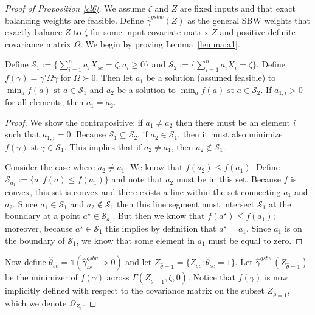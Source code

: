 \begin{proof}[Proof of Proposition \ref{cl6}]
We assume $\zeta$ and $Z$ are fixed inputs and that exact balancing weights are feasible. Define $\hat{\gamma}^{gsbw}(Z)$ as the general SBW weights that exactly balance $Z$ to $\zeta$ for some input covariate matrix $Z$ and positive definite covariance matrix $\Omega$. We begin by proving Lemma~\ref{lemma:a1}.

\begin{lemma}\label{lemma:a1}
    Define $\mathcal{S}_1 := \{\sum_{i=1}^n a_{i}X_{sc} = \zeta, a_{i} \ge 0\}$ and $\mathcal{S}_2 := \{\sum_{i=1}^n a_{i}X_{i} = \zeta\}$. Define $f(\gamma) = \gamma'\Omega\gamma$ for $\Omega \succ 0$. Then let $a_1$ be a solution (assumed feasible) to $\min_a f(a) \text{ st } a \in \mathcal{S}_1$ and $a_2$ be a solution to $\min_a f(a) \text{ st } a \in \mathcal{S}_2$. If $a_{1, i} > 0$ for all elements, then $a_1 = a_2$.
\end{lemma}

\begin{proof}
    We show the contrapositive: if $a_1 \ne a_2$ then there must be an element $i$ such that $a_{1, i} = 0$. Because $\mathcal{S}_1 \subseteq \mathcal{S}_2$, if $a_2 \in \mathcal{S}_1$, then it must also minimize $f(\gamma) \text{ st } \gamma \in \mathcal{S}_1$. This implies that if $a_2 \ne a_1$, then $a_2 \not\in \mathcal{S}_1$.
    
    Consider the case where $a_2 \ne a_1$. We know that $f(a_2) \le f(a_1)$. Define $\mathcal{S}_{a_1} := \{a: f(a) \le f(a_1)\}$ and note that $a_2$ must be in this set. Because $f$ is convex, this set is convex and there exists a line within the set connecting $a_1$ and $a_2$. Since $a_1 \in \mathcal{S}_1$ and $a_2 \not\in\mathcal{S}_1$ then this line segment must intersect $\mathcal{S}_1$ at the boundary at a point $a^\star \in \mathcal{S}_{a_1}$. But then we know that $f(a^\star) \le f(a_1)$; moreover, because $a^\star \in \mathcal{S}_1$ this implies by definition that $a^\star = a_1$. Since $a_1$ is on the boundary of $\mathcal{S}_1$, we know that some element in $a_1$ must be equal to zero. 
\end{proof}

Now define $\hat{\theta}_{sc} = \mathds{1}(\hat{\gamma}_{sc}^{gsbw} > 0)$ and let $Z_{\hat{\theta} = 1} = \{Z_{sc}: \hat{\theta}_{sc} = 1\}$. Let $\hat{\gamma}^{gsbw}(Z_{\hat{\theta} = 1})$ be the minimizer of $f(\gamma)$ across $\Gamma(Z_{\hat{\theta} = 1}, \zeta, 0)$. Notice that $f(\gamma)$ is now implicitly defined with respect to the covariance matrix on the subset $Z_{\hat{\theta} = 1}$, which we denote $\Omega_{Z_1}$. 


\end{proof}
